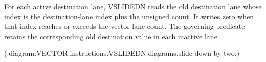 For each active destination lane, VSLIDEDN reads the old destination lane whose
index is the destination-lane index plus the unsigned count.  It writes zero
when that index reaches or exceeds the vector lane count.  The governing
predicate retains the corresponding old destination value in each inactive
lane.

(:diagram:VECTOR.instructions.VSLIDEDN.diagrams.slide-down-by-two:)

